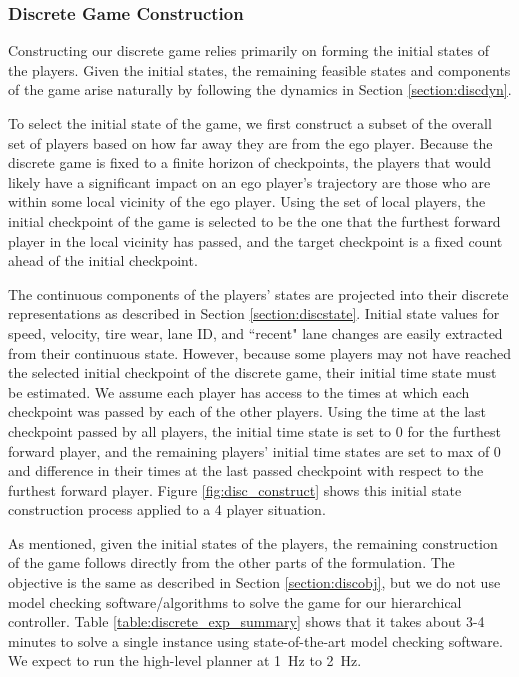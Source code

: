 \subsubsection{Discrete Game Construction}
Constructing our discrete game relies primarily on forming the initial states of the players. Given the initial states, the remaining feasible states and components of the game arise naturally by following the dynamics in Section \ref{section:discdyn}. 

To select the initial state of the game, we first construct a subset of the overall set of players based on how far away they are from the ego player. Because the discrete game is fixed to a finite horizon of checkpoints, the players that would likely have a significant impact on an ego player's trajectory are those who are within some local vicinity of the ego player. Using the set of local players, the initial checkpoint of the game is selected to be the one that the furthest forward player in the local vicinity has passed, and the target checkpoint is a fixed count ahead of the initial checkpoint. 

The continuous components of the players' states are projected into their discrete representations as described in Section \ref{section:discstate}. Initial state values for speed, velocity, tire wear, lane ID, and ``recent" lane changes are easily extracted from their continuous state. However, because some players may not have reached the selected initial checkpoint of the discrete game, their initial time state must be estimated. We assume each player has access to the times at which each checkpoint was passed by each of the other players. Using the time at the last checkpoint passed by all players, the initial time state is set to 0 for the furthest forward player, and the remaining players' initial time states are set to max of 0 and difference in their times at the last passed checkpoint with respect to the furthest forward player. Figure \ref{fig:disc_construct} shows this initial state construction process applied to a 4 player situation.

As mentioned, given the initial states of the players, the remaining construction of the game follows directly from the other parts of the formulation. The objective is the same as described in Section \ref{section:discobj}, but we do not use model checking software/algorithms to solve the game for our hierarchical controller. Table \ref{table:discrete_exp_summary} shows that it takes about 3-4 minutes to solve a single instance using state-of-the-art model checking software. We expect to run the high-level planner at \SI{1}{\hertz} to \SI{2}{\hertz}.

